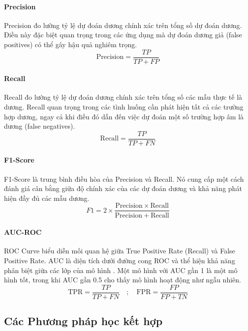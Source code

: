 \documentclass[10pt,twoside]{article}
\begin{document}
\paragraph{Precision} 
Precision \cite{grandini_metrics_2020} đo lường tỷ lệ dự đoán dương chính xác trên tổng số dự đoán dương. Điều này đặc biệt quan trọng trong các ứng dụng mà dự đoán dương giả (false positives) có thể gây hậu quả nghiêm trọng.
\begin{equation} 
\mathrm{Precision}=\frac{TP}{TP+FP}
\end{equation}
\paragraph{Recall} 
Recall \cite{grandini_metrics_2020} đo lường tỷ lệ dự đoán dương chính xác trên tổng số các mẫu thực tế là dương. Recall quan trọng trong các tình huống cần phát hiện tất cả các trường hợp dương, ngay cả khi điều đó dẫn đến việc dự đoán một số trường hợp âm là dương (false negatives).
\begin{equation} 
\mathrm{Recall}=\frac{TP}{TP+FN}
\end{equation}
\paragraph{F1-Score} 
F1-Score \cite{grandini_metrics_2020} là trung bình điều hòa của Precision và Recall. Nó cung cấp một cách đánh giá cân bằng giữa độ chính xác của các dự đoán dương và khả năng phát hiện đầy đủ các mẫu dương.
\begin{equation} 
F1=2\times\frac{\mathrm{Precision}\times\mathrm{Recall}}{\mathrm{Precision}+\mathrm{Recall}}
\end{equation}
\paragraph{AUC-ROC} 
ROC Curve biểu diễn mối quan hệ giữa True Positive Rate (Recall) và False Positive Rate. AUC là diện tích dưới đường cong ROC và thể hiện khả năng phân biệt giữa các lớp của mô hình \cite{fawcett_introduction_2006}. Một mô hình với AUC gần 1 là một mô hình tốt, trong khi AUC gần 0.5 cho thấy mô hình hoạt động như ngẫu nhiên.
\begin{equation} 
\mathrm{TPR}=\frac{TP}{TP+FN}\quad;\quad \mathrm{FPR}=\frac{FP}{FP+TN}
\end{equation}

\subsection{Các Phương pháp học kết hợp}
\end{document}

